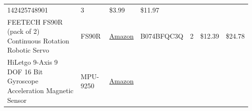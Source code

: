 \documentclass[]{article}
\begin{document}
\begin{appendices}
\begin{centering}
\begin{longtable}[]{@{}lllllll@{}}
\begin{minipage}[t]{0.17\columnwidth}
  142425748901\strut
  \end{minipage} & \begin{minipage}[t]{0.11\columnwidth}\raggedright
  3\strut
  \end{minipage} & \begin{minipage}[t]{0.06\columnwidth}\raggedright
  \$3.99\strut
  \end{minipage} & \begin{minipage}[t]{0.07\columnwidth}\raggedright
  \$11.97\strut
  \end{minipage}\tabularnewline
  \begin{minipage}[t]{0.15\columnwidth}\raggedright
  FEETECH FS90R (pack of 2) Continuous Rotation Robotic Servo\strut
  \end{minipage} & \begin{minipage}[t]{0.15\columnwidth}\raggedright
  FS90R\strut
  \end{minipage} & \begin{minipage}[t]{0.10\columnwidth}\raggedright
  \href{https://www.amazon.com/gp/product/B074BFQC3Q/ref=oh_aui_detailpage_o06_s00?ie=UTF8\&psc=1}{Amazon}\strut
  \end{minipage} & \begin{minipage}[t]{0.17\columnwidth}\raggedright
  B074BFQC3Q\strut
  \end{minipage} & \begin{minipage}[t]{0.11\columnwidth}\raggedright
  2\strut
  \end{minipage} & \begin{minipage}[t]{0.06\columnwidth}\raggedright
  \$12.39\strut
  \end{minipage} & \begin{minipage}[t]{0.07\columnwidth}\raggedright
  \$24.78\strut
  \end{minipage}\tabularnewline
  \begin{minipage}[t]{0.15\columnwidth}\raggedright
  HiLetgo 9-Axis 9 DOF 16 Bit Gyroscope Acceleration Magnetic Sensor\strut
  \end{minipage} & \begin{minipage}[t]{0.15\columnwidth}\raggedright
  MPU-9250\strut
  \end{minipage} & \begin{minipage}[t]{0.10\columnwidth}\raggedright
  \href{https://www.amazon.com/HiLetgo-Gyroscope-Acceleration-Accelerator-Magnetometer/dp/B01I1J0Z7Y/ref=redir_mobile_desktop?_encoding=UTF8\&dpID=51nl2fcMh6L\&dpPl=1\&keywords=mpu\%209250\&pi=AC_SX236_SY340_QL65\&qid=1512564044\&ref=plSrch\&ref_=mp_s_a_1_3\&sr=8-3}{Amazon}\strut

\end{minipage}
\end{longtable}
\end{centering}
\end{appendices}
\end{document}
